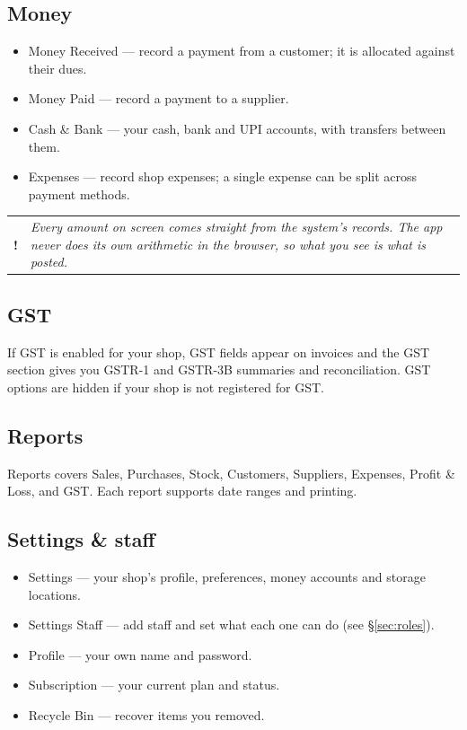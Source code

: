 \documentclass[11pt,a4paper]{article}
\makeatletter
\newcommand{\menu}[1]{\textsf{#1}}
\newenvironment{note}
  {\par\medskip\noindent\begin{tabular}{@{}p{0.03\textwidth}p{0.9\textwidth}@{}}
   \textbf{!} & \itshape}
  {\end{tabular}\par\medskip}
\makeatother
\begin{document}
\subsection{Money}
\begin{itemize}
  \item \menu{Money \textrightarrow{} Received} --- record a payment from a
        customer; it is allocated against their dues.
  \item \menu{Money \textrightarrow{} Paid} --- record a payment to a supplier.
  \item \menu{Cash \& Bank} --- your cash, bank and UPI accounts, with transfers
        between them.
  \item \menu{Expenses} --- record shop expenses; a single expense can be split
        across payment methods.
\end{itemize}

\begin{note}
Every amount on screen comes straight from the system's records. The app never
does its own arithmetic in the browser, so what you see is what is posted.
\end{note}

\subsection{GST}
If GST is enabled for your shop, GST fields appear on invoices and the
\menu{GST} section gives you GSTR-1 and GSTR-3B summaries and reconciliation.
GST options are hidden if your shop is not registered for GST.

\subsection{Reports}
\menu{Reports} covers Sales, Purchases, Stock, Customers, Suppliers, Expenses,
Profit \& Loss, and GST. Each report supports date ranges and printing.

\subsection{Settings \& staff}
\begin{itemize}
  \item \menu{Settings} --- your shop's profile, preferences, money accounts and
        storage locations.
  \item \menu{Settings \textrightarrow{} Staff} --- add staff and set what each
        one can do (see \S\ref{sec:roles}).
  \item \menu{Profile} --- your own name and password.
  \item \menu{Subscription} --- your current plan and status.
  \item \menu{Recycle Bin} --- recover items you removed.
\end{itemize}
\end{document}
